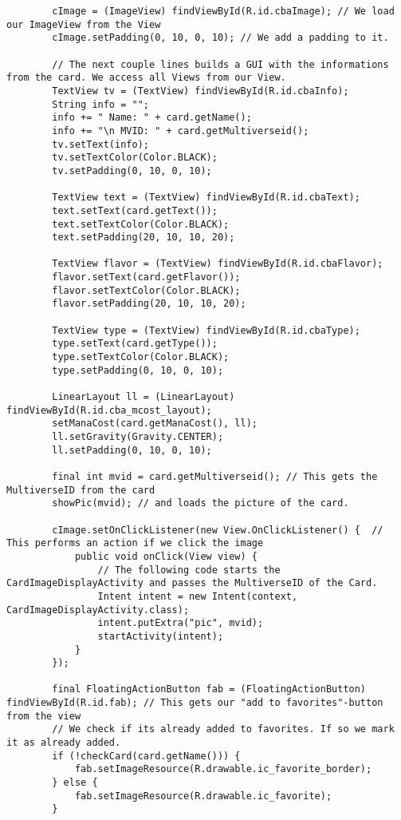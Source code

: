 \begin{lstlisting}
        cImage = (ImageView) findViewById(R.id.cbaImage); // We load our ImageView from the View
        cImage.setPadding(0, 10, 0, 10); // We add a padding to it.

        // The next couple lines builds a GUI with the informations from the card. We access all Views from our View.
        TextView tv = (TextView) findViewById(R.id.cbaInfo);
        String info = "";
        info += " Name: " + card.getName();
        info += "\n MVID: " + card.getMultiverseid();
        tv.setText(info);
        tv.setTextColor(Color.BLACK);
        tv.setPadding(0, 10, 0, 10);

        TextView text = (TextView) findViewById(R.id.cbaText);
        text.setText(card.getText());
        text.setTextColor(Color.BLACK);
        text.setPadding(20, 10, 10, 20);

        TextView flavor = (TextView) findViewById(R.id.cbaFlavor);
        flavor.setText(card.getFlavor());
        flavor.setTextColor(Color.BLACK);
        flavor.setPadding(20, 10, 10, 20);

        TextView type = (TextView) findViewById(R.id.cbaType);
        type.setText(card.getType());
        type.setTextColor(Color.BLACK);
        type.setPadding(0, 10, 0, 10);

        LinearLayout ll = (LinearLayout) findViewById(R.id.cba_mcost_layout);
        setManaCost(card.getManaCost(), ll);
        ll.setGravity(Gravity.CENTER);
        ll.setPadding(0, 10, 0, 10);

        final int mvid = card.getMultiverseid(); // This gets the MultiverseID from the card
        showPic(mvid); // and loads the picture of the card.

        cImage.setOnClickListener(new View.OnClickListener() {  // This performs an action if we click the image
            public void onClick(View view) {
                // The following code starts the CardImageDisplayActivity and passes the MultiverseID of the Card.
                Intent intent = new Intent(context, CardImageDisplayActivity.class);
                intent.putExtra("pic", mvid);
                startActivity(intent);
            }
        });

        final FloatingActionButton fab = (FloatingActionButton) findViewById(R.id.fab); // This gets our "add to favorites"-button from the view
        // We check if its already added to favorites. If so we mark it as already added.
        if (!checkCard(card.getName())) {
            fab.setImageResource(R.drawable.ic_favorite_border);
        } else {
            fab.setImageResource(R.drawable.ic_favorite);
        }


\end{lstlisting}

